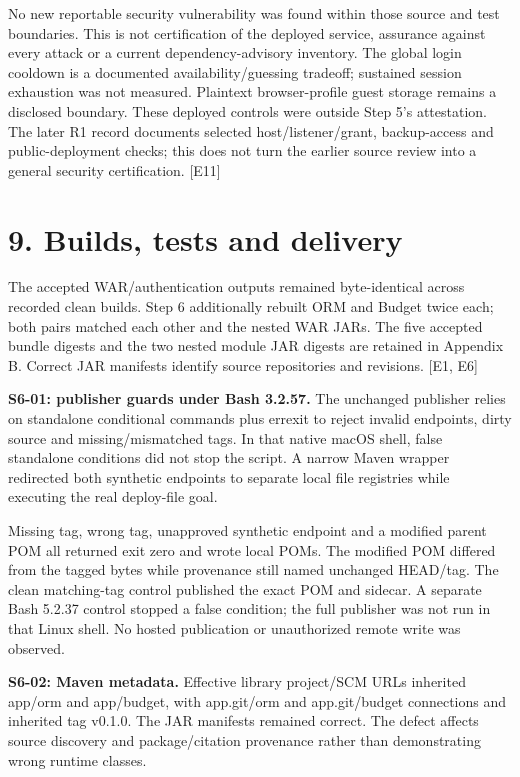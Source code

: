 \documentclass[11pt,a4paper]{article}
\begin{document}
No new reportable security vulnerability was found within those source and test boundaries. This is not certification of the deployed service, assurance against every attack or a current dependency-advisory inventory. The global login cooldown is a documented availability/\allowbreak{}guessing tradeoff; sustained session exhaustion was not measured. Plaintext browser-profile guest storage remains a disclosed boundary. These deployed controls were outside Step 5's attestation. The later R1 record documents selected host/\allowbreak{}listener/\allowbreak{}grant, backup-access and public-deployment checks; this does not turn the earlier source review into a general security certification. [E11]

\section*{9. Builds, tests and delivery}

The accepted WAR/\allowbreak{}authentication outputs remained byte-identical across recorded clean builds. Step 6 additionally rebuilt ORM and Budget twice each; both pairs matched each other and the nested WAR JARs. The five accepted bundle digests and the two nested module JAR digests are retained in Appendix B. Correct JAR manifests identify source repositories and revisions. [E1, E6]

\textbf{S6-01: publisher guards under Bash 3.2.57.} The unchanged publisher relies on standalone conditional commands plus errexit to reject invalid endpoints, dirty source and missing/\allowbreak{}mismatched tags. In that native macOS shell, false standalone conditions did not stop the script. A narrow Maven wrapper redirected both synthetic endpoints to separate local file registries while executing the real deploy-file goal.

Missing tag, wrong tag, unapproved synthetic endpoint and a modified parent POM all returned exit zero and wrote local POMs. The modified POM differed from the tagged bytes while provenance still named unchanged HEAD/\allowbreak{}tag. The clean matching-tag control published the exact POM and sidecar. A separate Bash 5.2.37 control stopped a false condition; the full publisher was not run in that Linux shell. No hosted publication or unauthorized remote write was observed.

\textbf{S6-02: Maven metadata.} Effective library project/\allowbreak{}SCM URLs inherited app/\allowbreak{}orm and app/\allowbreak{}budget, with app.git/\allowbreak{}orm and app.git/\allowbreak{}budget connections and inherited tag v0.1.0. The JAR manifests remained correct. The defect affects source discovery and package/\allowbreak{}citation provenance rather than demonstrating wrong runtime classes.
\end{document}
